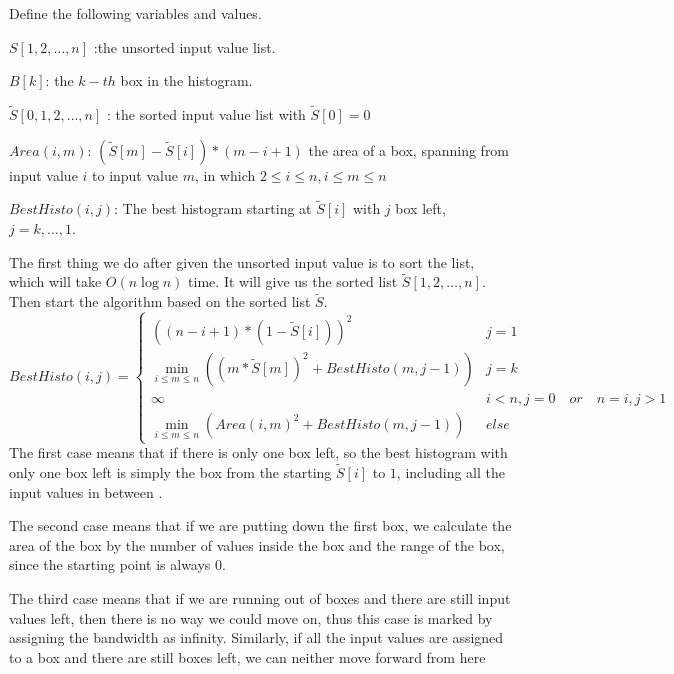 \documentclass[11pt]{article}
\begin{document}


\begin{solution}[Problem 1]
Define the following variables and values.

\noindent $S[1,2,\ldots,n]$ :the unsorted input value list.

\noindent $B[k]$: the $k-th$ box in the histogram.

\noindent $\widetilde{S}[0,1,2,\ldots,n]$ : the sorted input value list with $\widetilde{S}[0]=0$

\noindent $Area(i,m)$: $(\widetilde{S}[m]-\widetilde{S}[i])*(m-i+1)$ the area of a box, spanning from input value $i$ to input value $m$, in which $2\leq i\leq n, i\leq m \leq n$

\noindent $BestHisto(i,j)$: The best histogram starting at $\widetilde{S}[i]$ with $j$ box left, $j=k,\ldots, 1$.

The first thing we do after given the unsorted input value is to sort the list, which will take $O(n\log{n})$ time. It will give us the sorted list $\widetilde{S}[1,2,\ldots,n]$. Then start the algorithm based on the sorted list $\widetilde{S}$.
\[
BestHisto(i,j) =
\begin{cases} 
 {((n-i+1)*(1-\widetilde{S}[i]))}^2& j=1 \\ 
\min_{i\leq m\leq n} ({(m*\widetilde{S}[m])}^2+ BestHisto(m,j-1))& j=k \\ 
\infty & i<n,  j =0 \quad or \quad n=i, j> 1\\
\min_{i\leq m\leq n} ({Area(i,m)}^2+ BestHisto(m,j-1))& else 
\end{cases}
\]
The first case means that if there is only one box left, so the best histogram with only one box left is simply the box from the starting $\widetilde{S}[i]$ to $1$, including all the input values in between .

\noindent The second case means that if we are putting down the first box, we calculate the area of the box by the number of values inside the box and the range of the box, since the starting point is always 0.

\noindent The third case means that if we are running out of boxes and there are still input values left, then  there is no way we could move on, thus this case is marked by assigning the bandwidth as infinity. Similarly, if all the input values are assigned to a box and there are still boxes left, we can neither move forward from here


\end{solution}
\end{document}
